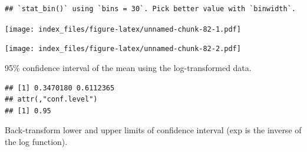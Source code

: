 \documentclass[]{article}
\newenvironment{Shaded}{\begin{snugshade}}{\end{snugshade}}
\newcommand{\DataTypeTok}[1]{\textcolor[rgb]{0.13,0.29,0.53}{#1}}
\newcommand{\DecValTok}[1]{\textcolor[rgb]{0.00,0.00,0.81}{#1}}
\newcommand{\KeywordTok}[1]{\textcolor[rgb]{0.13,0.29,0.53}{\textbf{#1}}}
\newcommand{\NormalTok}[1]{#1}
\newcommand{\OperatorTok}[1]{\textcolor[rgb]{0.81,0.36,0.00}{\textbf{#1}}}
\newcommand{\StringTok}[1]{\textcolor[rgb]{0.31,0.60,0.02}{#1}}
\begin{document}
\begin{verbatim}
## `stat_bin()` using `bins = 30`. Pick better value with `binwidth`.
\end{verbatim}

\texttt{[image: index\_files/figure-latex/unnamed-chunk-82-1.pdf]}

\begin{Shaded}
\end{Shaded}

\texttt{[image: index\_files/figure-latex/unnamed-chunk-82-2.pdf]}

95\% confidence interval of the mean using the log-transformed data.

\begin{Shaded}
\end{Shaded}

\begin{verbatim}
## [1] 0.3470180 0.6112365
## attr(,"conf.level")
## [1] 0.95
\end{verbatim}

Back-transform lower and upper limits of confidence interval (exp is the
inverse of the log function).

\begin{Shaded}
\end{Shaded}
\end{document}
